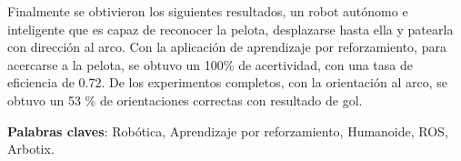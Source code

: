 Finalmente se obtivieron los siguientes resultados, un robot aut\'onomo e inteligente que es capaz de reconocer la pelota, desplazarse hasta ella y patearla con direcci\'on al arco. Con la aplicaci\'on de aprendizaje por reforzamiento, para acercarse a la pelota, se obtuvo un 100\% de acertividad, con una tasa de eficiencia de $0.72$. De los experimentos completos, con la orientaci\'on al arco, se obtuvo un 53 \% de orientaciones correctas con resultado de gol.

\textbf{Palabras claves}: Rob\'otica, Aprendizaje por reforzamiento, Humanoide, ROS, Arbotix.


